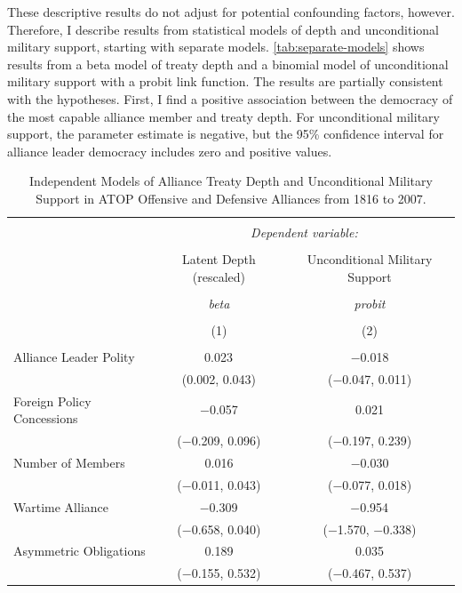 \documentclass[12pt]{article}
\begin{document}
These descriptive results do not adjust for potential confounding factors, however.
Therefore, I describe results from statistical models of depth and unconditional military support, starting with separate models. 
\autoref{tab:separate-models} shows results from a beta model of treaty depth and a binomial model of unconditional military support with a probit link function. 
The results are partially consistent with the hypotheses.
First, I find a positive association between the democracy of the most capable alliance member and treaty depth. 
For unconditional military support, the parameter estimate is negative, but the 95\% confidence interval for alliance leader democracy includes zero and positive values. 


\begin{table}[!htbp] \centering 
  \caption{Independent Models of Alliance Treaty Depth and Unconditional Military Support in ATOP Offensive and Defensive Alliances from 1816 to 2007.} 
  \label{tab:separate-models} 
\begin{tabular}{@{\extracolsep{5pt}}lcc} 
\\[-1.8ex]\hline 
\hline \\[-1.8ex] 
 & \multicolumn{2}{c}{\textit{Dependent variable:}} \\ 
\cline{2-3} 
\\[-1.8ex] & Latent Depth (rescaled) & Unconditional Military Support \\ 
\\[-1.8ex] & \textit{beta} & \textit{probit} \\ 
\\[-1.8ex] & (1) & (2)\\ 
\hline \\[-1.8ex] 
  Alliance Leader Polity & 0.023$^{}$ & $-$0.018 \\ 
  & (0.002, 0.043) & ($-$0.047, 0.011) \\ 
  Foreign Policy Concessions & $-$0.057 & 0.021 \\ 
  & ($-$0.209, 0.096) & ($-$0.197, 0.239) \\ 
  Number of Members & 0.016 & $-$0.030 \\ 
  & ($-$0.011, 0.043) & ($-$0.077, 0.018) \\ 
  Wartime Alliance & $-$0.309$^{}$ & $-$0.954$^{}$ \\ 
  & ($-$0.658, 0.040) & ($-$1.570, $-$0.338) \\ 
  Asymmetric Obligations & 0.189 & 0.035 \\ 
  & ($-$0.155, 0.532) & ($-$0.467, 0.537) \\ 

\end{tabular}
\end{table}
\end{document}

